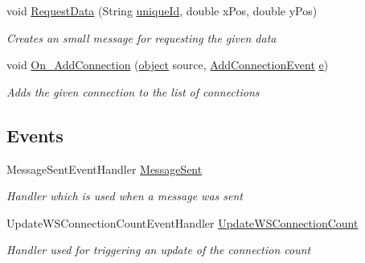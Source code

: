 \begin{DoxyCompactItemize}
void \hyperlink{class_web_analyzer_1_1_server_1_1_connection_manager_a8b3ba4008dc9ee54a092c532132df757}{Request\+Data} (String \hyperlink{_u_i_2_h_t_m_l_resources_2js_2lib_2underscore_8min_8js_af690ff5521d79c7128861033ae80ae17}{unique\+Id}, double x\+Pos, double y\+Pos)
\begin{DoxyCompactList}\small\item\em Creates an small message for requesting the given data \end{DoxyCompactList}\item 
void \hyperlink{class_web_analyzer_1_1_server_1_1_connection_manager_a912992bce817cbf9177db239f7716a1e}{On\+\_\+\+Add\+Connection} (\hyperlink{_u_i_2_h_t_m_l_resources_2js_2lib_2underscore_8min_8js_aae18b7515bb2bc4137586506e7c0c903}{object} source, \hyperlink{class_web_analyzer_1_1_events_1_1_add_connection_event}{Add\+Connection\+Event} \hyperlink{_u_i_2_h_t_m_l_resources_2js_2lib_2bootstrap_8min_8js_ab5902775854a8b8440bcd25e0fe1c120}{e})
\begin{DoxyCompactList}\small\item\em Adds the given connection to the list of connections \end{DoxyCompactList}\end{DoxyCompactItemize}
\subsection*{Events}
\begin{DoxyCompactItemize}
\item 
Message\+Sent\+Event\+Handler \hyperlink{class_web_analyzer_1_1_server_1_1_connection_manager_a2eb5de18882e69a65b4b7ce3ee458af1}{Message\+Sent}
\begin{DoxyCompactList}\small\item\em Handler which is used when a message was sent \end{DoxyCompactList}\item 
Update\+W\+S\+Connection\+Count\+Event\+Handler \hyperlink{class_web_analyzer_1_1_server_1_1_connection_manager_ab583440105517709081698d731b2bdcd}{Update\+W\+S\+Connection\+Count}
\begin{DoxyCompactList}\small\item\em Handler used for triggering an update of the connection count \end{DoxyCompactList}\end{DoxyCompactItemize}
